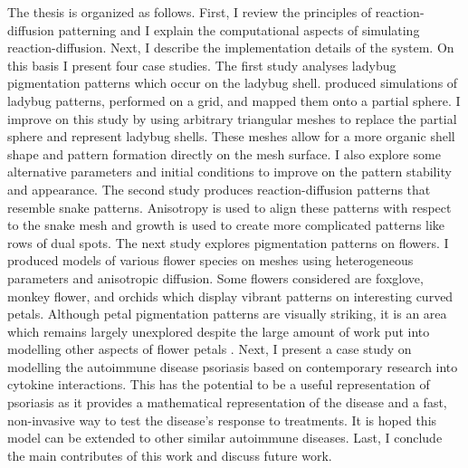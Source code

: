 
The thesis is organized as follows. First, I review the principles of reaction-diffusion patterning and I explain the computational aspects of simulating reaction-diffusion. Next, I describe the implementation details of the \ProgramName{} system. On this basis I present four case studies. The first study analyses ladybug pigmentation patterns which occur on the ladybug shell. \citep{liaw2001} produced simulations of ladybug patterns, performed on a grid, and mapped them onto a partial sphere. I improve on this study by using arbitrary triangular meshes to replace the partial sphere and represent ladybug shells. These meshes allow for a more organic shell shape and pattern formation directly on the mesh surface. I also explore some alternative parameters and initial conditions to improve on the pattern stability and appearance. The second study produces reaction-diffusion patterns that resemble snake patterns. Anisotropy is used to align these patterns with respect to the snake mesh and growth is used to create more complicated patterns like rows of dual spots. The next study explores pigmentation patterns on flowers. I produced models of various flower species on meshes using heterogeneous parameters and anisotropic diffusion. Some flowers considered are foxglove, monkey flower, and orchids which display vibrant patterns on interesting curved petals. Although petal pigmentation patterns are visually striking, it is an area which remains largely unexplored despite the large amount of work put into modelling other aspects of flower petals \citep{owens2016}. Next, I present a case study on modelling the autoimmune disease psoriasis based on contemporary research into cytokine interactions. This has the potential to be a useful representation of psoriasis as it provides a mathematical representation of the disease and a fast, non-invasive way to test the disease's response to treatments. It is hoped this model can be extended to other similar autoimmune diseases. Last, I conclude the main contributes of this work and discuss future work.